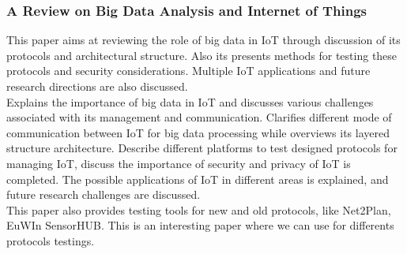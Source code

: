 \subsubsection{A Review on Big Data Analysis and Internet of Things}\cite{Paper5}
This paper aims at reviewing the role of big data in IoT through discussion of its protocols and architectural structure. Also its presents methods for testing these protocols and security considerations. Multiple IoT applications and future research directions are also discussed.\\
Explains the importance of big data in IoT and discusses various challenges associated with its management and communication. Clarifies different mode of communication between IoT for big data processing while overviews its layered structure architecture. Describe different platforms to test designed protocols for managing IoT, discuss the importance of security and privacy of IoT is completed. The possible applications of IoT in different areas is explained, and future research challenges are discussed. \\
This paper also provides testing tools for new and old protocols, like Net2Plan, EuWIn SensorHUB.
This is an interesting paper where we can use for differents protocols testings.

